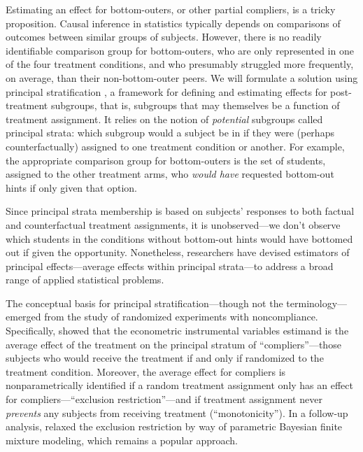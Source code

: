 \documentclass[]{article}
\begin{document}
Estimating an effect for bottom-outers, or other partial compliers, is a tricky proposition.
Causal inference in statistics typically depends on comparisons of outcomes between similar groups of subjects. However, there is no readily identifiable comparison group for bottom-outers, who are only represented in one of the four treatment conditions, and who presumably struggled more frequently, on average, than their non-bottom-outer peers.
We will formulate a solution using principal stratification \citep{frangakis}, a framework for defining and estimating effects for post-treatment subgroups, that is, subgroups that may themselves be a function of treatment assignment. It relies on the notion of \emph{potential} subgroups called principal strata: which subgroup would a subject be in if they were (perhaps counterfactually) assigned to one treatment condition or another.
For example, the appropriate comparison group for bottom-outers is the set of students, assigned to the other treatment arms, who \emph{would have} requested bottom-out hints if only given that option.

Since principal strata membership is based on subjects' responses to both factual and counterfactual treatment assignments, it is unobserved---we don't observe which students in the conditions without bottom-out hints would have bottomed out if given the opportunity.
Nonetheless, researchers have devised estimators of principal effects---average effects within principal strata---to address a broad range of applied statistical problems.

\label{background}The conceptual basis for principal stratification---though not the terminology---emerged from the study of randomized experiments with noncompliance. Specifically, \citet{air} showed that the econometric instrumental variables estimand is the average effect of the treatment on the principal stratum of ``compliers''---those subjects who would receive the treatment if and only if randomized to the treatment condition. Moreover, the average effect for compliers is nonparametrically identified if a random treatment assignment only has an effect for compliers---``exclusion restriction''---and if treatment assignment never \emph{prevents} any subjects from receiving treatment (``monotonicity'').
In a follow-up analysis, \citet{imbens1997bayesian} relaxed the exclusion restriction by way of parametric Bayesian finite mixture modeling, which remains a popular approach.
\end{document}
